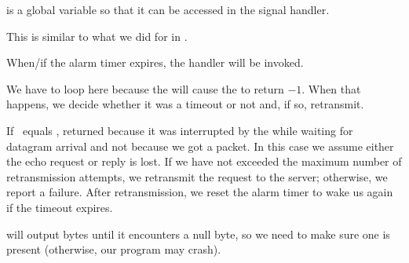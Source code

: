 \begin{topcode}



 is a global variable so that it can be accessed in the
signal handler.


This is similar to what  we did for  in
.


When/if the alarm timer expires, the handler 
will be invoked.



We have to loop here because the  will cause 
the  to return $-1$.  When that
happens, we decide whether it was  a timeout or not and, if so, retransmit.

\begin{bottomcode}



If \ equals ,
 returned
because it was interrupted by the  while
waiting
for datagram arrival and not because we  got a packet.  In this case
we assume either the echo request or reply is lost.  If we have not
exceeded the maximum number of retransmission attempts, we retransmit
the request to the server; otherwise, we report a failure.  After
retransmission, we reset the alarm timer to wake us again if the
timeout expires.

\end{bottomcode}


\begin{bottomcode}



 will output bytes  until it encounters a null byte,
so we need to make sure one is present (otherwise, our program may crash).


\end{bottomcode}

\end{topcode}


